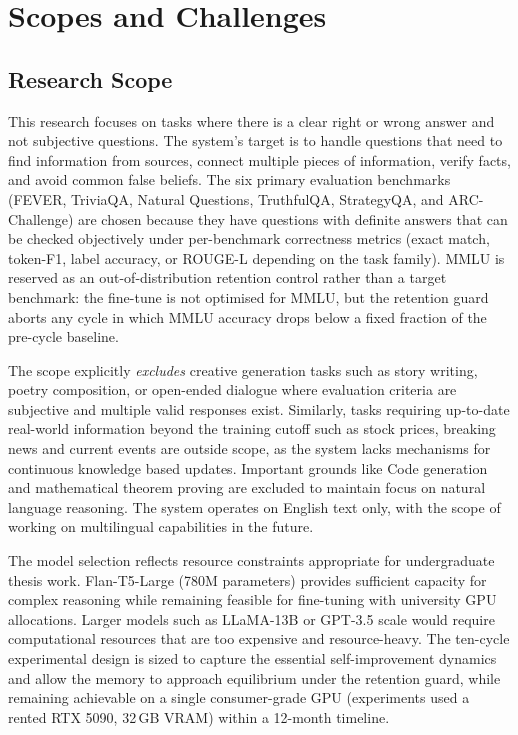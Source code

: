\section{Scopes and Challenges}

\subsection{Research Scope}

This research focuses on tasks where there is a clear right or wrong answer and not subjective questions. The system's target is to handle questions that need to find information from sources, connect multiple pieces of information, verify facts, and avoid common false beliefs. The six primary evaluation benchmarks (FEVER, TriviaQA, Natural Questions, TruthfulQA, StrategyQA, and ARC-Challenge) are chosen because they have questions with definite answers that can be checked objectively under per-benchmark correctness metrics (exact match, token-F1, label accuracy, or ROUGE-L depending on the task family). MMLU is reserved as an out-of-distribution retention control rather than a target benchmark: the fine-tune is not optimised for MMLU, but the retention guard aborts any cycle in which MMLU accuracy drops below a fixed fraction of the pre-cycle baseline.

The scope explicitly \textit{excludes} creative generation tasks such as story writing, poetry composition, or open-ended dialogue where evaluation criteria are subjective and multiple valid responses exist. Similarly, tasks requiring up-to-date real-world information beyond the training cutoff such as stock prices, breaking news and current events are outside scope, as the system lacks mechanisms for continuous knowledge based updates. Important grounds like Code generation and mathematical theorem proving are excluded to maintain focus on natural language reasoning. The system operates on English text only, with the scope of working on multilingual capabilities in the future.

The model selection reflects resource constraints appropriate for undergraduate thesis work. Flan-T5-Large (780M parameters) provides sufficient capacity for complex reasoning while remaining feasible for fine-tuning with university GPU allocations. Larger models such as LLaMA-13B or GPT-3.5 scale would require computational resources that are too expensive and resource-heavy. The ten-cycle experimental design is sized to capture the essential self-improvement dynamics and allow the memory to approach equilibrium under the retention guard, while remaining achievable on a single consumer-grade GPU (experiments used a rented RTX 5090, 32\,GB VRAM) within a 12-month timeline.

